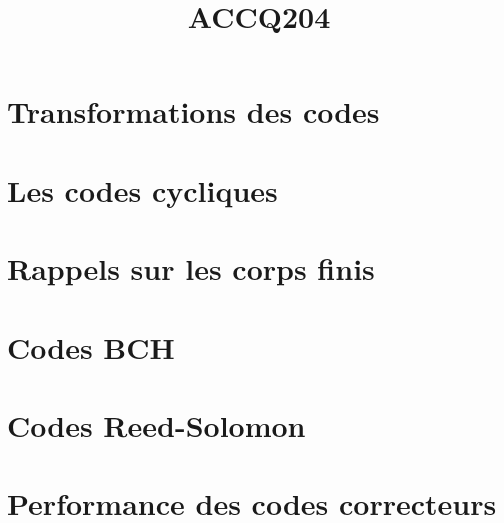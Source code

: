 \documentclass[a4paper,10pt]{article}
\title{\vspace{-1.2cm} \textbf{ACCQ204}}
\begin{document}
\maketitle

\vspace{-1.5cm}

\section{Transformations des codes}

	

\section{Les codes cycliques}

	

\section{Rappels sur les corps finis}

	

\section{Codes BCH}

	

\section{Codes Reed-Solomon}

	


%	

\section{Performance des codes correcteurs}

	
\end{document}
